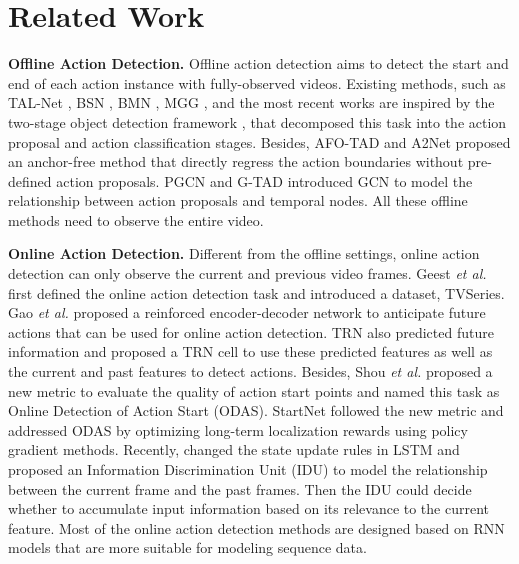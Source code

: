 \documentclass[final]{cvpr}
\begin{document}
\section{Related Work}

\noindent \textbf{Offline Action Detection.} Offline action detection aims to detect the start and end of each action instance with fully-observed videos. Existing methods, such as TAL-Net \cite{chao2018rethinking}, BSN  \cite{lin2018bsn}, BMN \cite{lin2019bmn}, MGG \cite{liu2019multi}, and the most recent works \cite{gao2020accurate, zhao2020bottom} are inspired by the two-stage object detection framework \cite{ren2017faster}, that decomposed this task into the action proposal and action classification stages. Besides, AFO-TAD \cite{tang2019afotad} and A2Net \cite{yang2020revisiting} proposed an anchor-free method that directly regress the action boundaries without pre-defined action proposals. PGCN \cite{zeng2019graph} and G-TAD \cite{xu2020gtad} introduced GCN \cite{kipf2017semi} to model the relationship between action proposals and temporal nodes. All these offline methods need to observe the entire video.

\vspace{4pt}
\noindent \textbf{Online Action Detection.} Different from the offline settings, online action detection can only observe the current and previous video frames. Geest \emph{et al.} \cite{geest2016online} first defined the online action detection task and introduced a dataset, TVSeries. Gao \emph{et al.} \cite{gao2017red} proposed a reinforced encoder-decoder network to anticipate future actions that can be used for online action detection. TRN \cite{xu2019trn} also predicted future information and proposed a TRN cell to use these predicted features as well as the current and past features to detect actions. Besides, Shou \emph{et al.} \cite{shou2018online} proposed a new metric to evaluate the quality of action start points and named this task as Online Detection of Action Start (ODAS). StartNet \cite{gao2019startnet} followed the new metric and addressed ODAS by optimizing long-term localization rewards using policy gradient methods. Recently, \cite{eun2020learning} changed the state update rules in LSTM and proposed an Information Discrimination Unit (IDU) to model the relationship between the current frame and the past frames. Then the IDU could decide whether to accumulate input information based on its relevance to the current feature. Most of the online action detection methods are designed based on RNN models that are more suitable for modeling sequence data.
\end{document}
